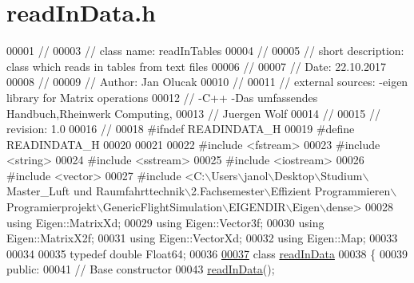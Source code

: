 \hypertarget{read_in_data_8h_source}{}\section{read\+In\+Data.\+h}
\label{read_in_data_8h_source}

\begin{DoxyCode}
00001 \textcolor{comment}{//}
00003 \textcolor{comment}{// class name:          readInTables}
00004 \textcolor{comment}{//}
00005 \textcolor{comment}{// short description:   class which reads in tables from text files}
00006 \textcolor{comment}{//}
00007 \textcolor{comment}{// Date:                22.10.2017}
00008 \textcolor{comment}{//}
00009 \textcolor{comment}{// Author:              Jan Olucak}
00010 \textcolor{comment}{//}
00011 \textcolor{comment}{// external sources:    -eigen library for Matrix operations}
00012 \textcolor{comment}{//                      -C++ -Das umfassendes Handbuch,Rheinwerk Computing,}
00013 \textcolor{comment}{//                       Juergen Wolf}
00014 \textcolor{comment}{//}
00015 \textcolor{comment}{// revision:            1.0}
00016 \textcolor{comment}{//}
00018 \textcolor{comment}{}\textcolor{preprocessor}{#ifndef READINDATA\_H}
00019 \textcolor{preprocessor}{#define READINDATA\_H}
00020 
00021 
00022 \textcolor{preprocessor}{#include <fstream>}
00023 \textcolor{preprocessor}{#include <string>}
00024 \textcolor{preprocessor}{#include <sstream>}
00025 \textcolor{preprocessor}{#include <iostream>}
00026 \textcolor{preprocessor}{#include <vector>}
00027 \textcolor{preprocessor}{#include <C:\(\backslash\)Users\(\backslash\)janol\(\backslash\)Desktop\(\backslash\)Studium\(\backslash\)Master\_Luft und Raumfahrttechnik\(\backslash\)2.Fachsemester\(\backslash\)Effizient
       Programmieren\(\backslash\)Programierprojekt\(\backslash\)GenericFlightSimulation\(\backslash\)EIGENDIR\(\backslash\)Eigen\(\backslash\)dense>}
00028 \textcolor{keyword}{using} Eigen::MatrixXd;
00029 \textcolor{keyword}{using} Eigen::Vector3f;
00030 \textcolor{keyword}{using} Eigen::MatrixX2f;
00031 \textcolor{keyword}{using} Eigen::VectorXd;
00032 \textcolor{keyword}{using} Eigen::Map;
00033 
00034 
00035 \textcolor{keyword}{typedef} \textcolor{keywordtype}{double} Float64;
00036 
\hyperlink{classread_in_data}{00037} \textcolor{keyword}{class }\hyperlink{classread_in_data}{readInData}
00038 \{
00039 \textcolor{keyword}{public}:
00041     \textcolor{comment}{// Base constructor}
00043 \textcolor{comment}{}    \hyperlink{classread_in_data}{readInData}();

\end{DoxyCode}
